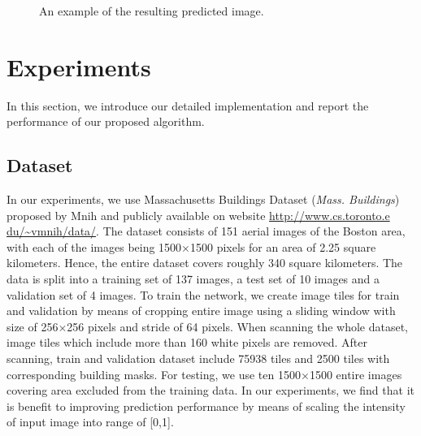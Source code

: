 \documentclass[runningheads]{llncs}
\begin{document}
\begin{figure}
\centering
{}	
\caption{ An example of the resulting predicted image.}
\label{fig:AGroupOfExamples}
\end{figure}


\section{Experiments}
\label{section:experiments}
In this section, we introduce our detailed implementation and report the performance of our proposed algorithm.

\subsection{Dataset}
   In our experiments, we use Massachusetts Buildings Dataset (\textit{Mass. Buildings}) proposed by Mnih \cite{Mnih2013Machine} and publicly available on website \url{http://www.cs.toronto.e
du/~vmnih/data/}. The dataset consists of 151 aerial images of the Boston area, with each of the images being 1500$\times$1500 pixels for an area of 2.25 square kilometers. Hence, the entire dataset covers roughly 340 square kilometers. The data is split into a training set of 137 images, a test set of 10 images and a validation set of 4 images. To train the network, we create image tiles for train and validation by means of cropping entire image using a sliding window with size of 256$\times$256 pixels and stride of 64 pixels. When scanning the whole dataset, image tiles which include more than 160 white pixels are removed. After scanning, train and validation dataset include 75938 tiles and 2500 tiles with corresponding building masks. For testing, we use ten 1500$\times$1500 entire images covering area excluded from the training data. In our experiments, we find that it is benefit to improving prediction performance by means of scaling the intensity of input image into range of [0,1]. 
\end{document}
